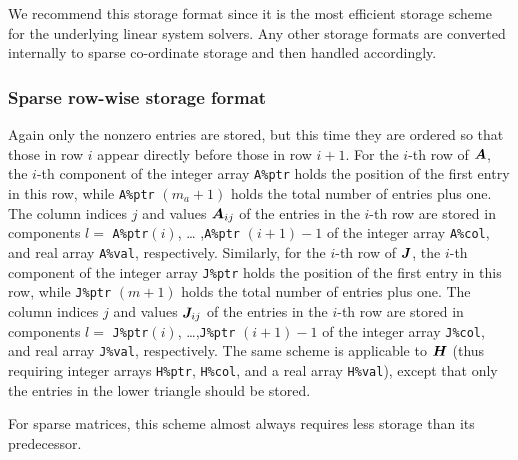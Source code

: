 \documentclass{galahad}
\begin{document}
We recommend this storage format since it is the most efficient
storage scheme for the underlying linear system solvers.  Any other
storage formats are converted internally to sparse co-ordinate
storage and then handled accordingly.

\subsubsection{Sparse row-wise storage format}\label{rowwise}
Again only the nonzero entries are stored, but this time they are
ordered so that those in row $i$ appear directly before those in row
$i+1$. For the $i$-th row of ${\bm{A}}$, the $i$-th component of the integer
array {\tt A\%ptr} holds the position of the first entry in this row,
while {\tt A\%ptr} $(m_a+1)$ holds the total number of entries plus one.
The column indices $j$ and values ${\bm{A}}_{ij}$ of the entries in the
$i$-th row are stored in components $l =$ {\tt A\%ptr}$(i)$, \ldots
,{\tt A\%ptr} $(i+1)-1$ of the integer array {\tt A\%col}, and real
array {\tt A\%val}, respectively.  Similarly, for the $i$-th row of
${\bm{J}}$, the $i$-th component of the integer array {\tt J\%ptr} holds the
position of the first entry in this row, while {\tt J\%ptr} $(m+1)$
holds the total number of entries plus one.  The column indices $j$
and values ${\bm{J}}_{ij}$ of the entries in the $i$-th row are stored in
components $l =$ {\tt J\%ptr}$(i)$, \ldots ,{\tt J\%ptr} $(i+1)-1$ of
the integer array {\tt J\%col}, and real array {\tt J\%val},
respectively.  The same scheme is applicable to
${\bm{H}}$ (thus requiring integer arrays {\tt H\%ptr}, {\tt H\%col}, and 
a real array {\tt H\%val}),
except that only the entries in the lower triangle should be stored.

For sparse matrices, this scheme almost always requires less storage than 
its predecessor.
\end{document}
